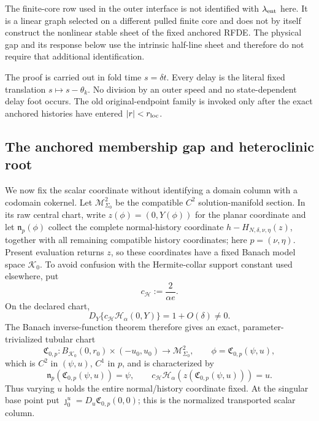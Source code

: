 \begin{theorem}
The finite-core row used in the outer interface is not identified with
\(\lambda_{\rm ent}\) here.  It is a linear graph selected on a different
pulled finite core and does not by itself construct the nonlinear stable
sheet of the fixed anchored RFDE.  The physical gap and its response below
use the intrinsic half-line sheet and therefore do not require that
additional identification.
\end{theorem}

The proof is carried out in fold time \(s=\delta t\).  Every delay is the
literal fixed translation \(s\mapsto s-\theta_k\).  No division by an outer
speed and no state-dependent delay foot occurs.  The old
original-endpoint family is invoked only after the exact anchored histories
have entered \(|r|<r_{\rm loc}\).

\subsection{The anchored membership gap and heteroclinic root}

We now fix the scalar coordinate without identifying a domain column with
a codomain cokernel.  Let \(\mathcal M_{\Sigma_0}^2\) be the compatible
\(C^2\) solution-manifold section.  In its raw central chart, write
\(z(\phi)=(0,Y(\phi))\) for the planar coordinate and let
\(\mathfrak n_p(\phi)\) collect the complete normal-history coordinate
\(h-H_{N,\delta,\nu,\eta}(z)\), together with all remaining compatible
history coordinates; here \(p=(\nu,\eta)\).  Present evaluation returns
\(z\), so these coordinates have a fixed Banach model space
\(\mathscr K_0\).  To avoid confusion with the Hermite-collar support
constant used elsewhere, put
\begin{equation}
 c_{\mathscr H}:=\frac{2}{\alpha e}.                 \label{eq:anchor-first-integral-normalization}
\end{equation}
On the declared chart,
\begin{equation}
 D_Y\{c_{\mathscr H}\mathscr H_\alpha(0,Y)\}
 =1+O(\delta)\ne0.                                  \label{eq:anchor-first-integral-local-invertibility}
\end{equation}
The Banach inverse-function theorem therefore gives an exact,
parameter-trivialized tubular chart
\begin{equation}
 \mathfrak C_{0,p}:B_{\mathscr K_0}(0,r_0)\times(-u_0,u_0)
   \longrightarrow\mathcal M_{\Sigma_0}^2,\qquad
 \phi=\mathfrak C_{0,p}(\psi,u),                    \label{eq:anchor-central-history-chart}
\end{equation}
which is \(C^2\) in \((\psi,u)\), \(C^1\) in \(p\), and is characterized by
\begin{equation}
 \mathfrak n_p(\mathfrak C_{0,p}(\psi,u))=\psi,
 \qquad
 c_{\mathscr H}\mathscr H_\alpha
   (z(\mathfrak C_{0,p}(\psi,u)))=u.                \label{eq:anchor-central-chart-identities}
\end{equation}
Thus varying \(u\) holds the entire normal/history coordinate fixed.  At
the singular base point put
\(\jmath_0^u=D_u\mathfrak C_{0,p}(0,0)\); this is the normalized transported
scalar column.

